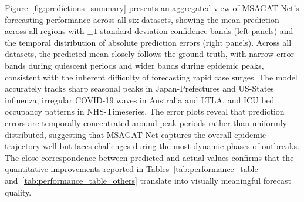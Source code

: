 \documentclass[a4paper,fleqn]{cas-dc}
\begin{document}
Figure~\ref{fig:predictions_summary} presents an aggregated view of MSAGAT-Net's forecasting performance across all six datasets, showing the mean prediction across all regions with $\pm 1$ standard deviation confidence bands (left panels) and the temporal distribution of absolute prediction errors (right panels). Across all datasets, the predicted mean closely follows the ground truth, with narrow error bands during quiescent periods and wider bands during epidemic peaks, consistent with the inherent difficulty of forecasting rapid case surges. The model accurately tracks sharp seasonal peaks in Japan-Prefectures and US-States influenza, irregular COVID-19 waves in Australia and LTLA, and ICU bed occupancy patterns in NHS-Timeseries. The error plots reveal that prediction errors are temporally concentrated around peak periods rather than uniformly distributed, suggesting that MSAGAT-Net captures the overall epidemic trajectory well but faces challenges during the most dynamic phases of outbreaks. The close correspondence between predicted and actual values confirms that the quantitative improvements reported in Tables~\ref{tab:performance_table} and~\ref{tab:performance_table_others} translate into visually meaningful forecast quality.
\end{document}
